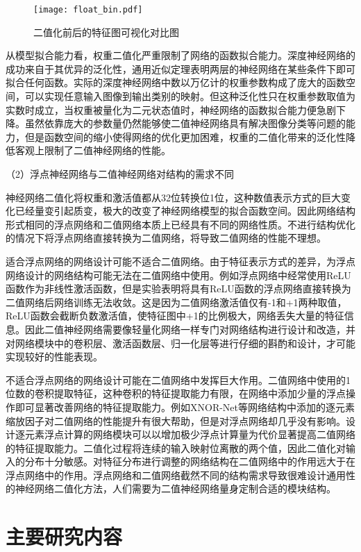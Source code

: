 \begin{figure}[htb]
  \centering
  \texttt{[image: float\_bin.pdf]}
  \caption{二值化前后的特征图可视化对比图}
  \label{fig:float_bin}
\end{figure}

从模型拟合能力看，权重二值化严重限制了网络的函数拟合能力。深度神经网络的成功来自于其优异的泛化性，通用近似定理\citep{ua}表明两层的神经网络在某些条件下即可拟合任何函数。实际的深度神经网络中数以万亿计的权重参数构成了庞大的函数空间，可以实现任意输入图像到输出类别的映射。但这种泛化性只在权重参数取值为实数时成立，当权重被量化为二元状态值时，神经网络的函数拟合能力便急剧下降。虽然依靠庞大的参数量仍然能够使二值神经网络具有解决图像分类等问题的能力，但是函数空间的缩小使得网络的优化更加困难，权重的二值化带来的泛化性降低客观上限制了二值神经网络的性能。

（2）浮点神经网络与二值神经网络对结构的需求不同

神经网络二值化将权重和激活值都从32位转换位1位，这种数值表示方式的巨大变化已经量变引起质变，极大的改变了神经网络模型的拟合函数空间。因此网络结构形式相同的浮点网络和二值网络本质上已经具有不同的网络性质。不进行结构优化的情况下将浮点网络直接转换为二值网络，将导致二值网络的性能不理想。

适合浮点网络的网络设计可能不适合二值网络。由于特征表示方式的差异，为浮点网络设计的网络结构可能无法在二值网络中使用。例如浮点网络中经常使用ReLU函数作为非线性激活函数，但是实验表明将具有ReLU函数的浮点网络直接转换为二值网络后网络训练无法收敛。这是因为二值网络激活值仅有-1和+1两种取值，ReLU函数会截断负数激活值，使特征图中+1的比例极大，网络丢失大量的特征信息。因此二值神经网络需要像轻量化网络一样专门对网络结构进行设计和改造，并对网络模块中的卷积层、激活函数层、归一化层等进行仔细的斟酌和设计，才可能实现较好的性能表现。

不适合浮点网络的网络设计可能在二值网络中发挥巨大作用。二值网络中使用的1位数的卷积提取特征，这种卷积的特征提取能力有限，在网络中添加少量的浮点操作即可显著改善网络的特征提取能力。例如XNOR-Net\cite{xnornet}等网络结构中添加的逐元素缩放因子对二值网络的性能提升有很大帮助，但是对浮点网络却几乎没有影响。设计逐元素浮点计算的网络模块可以以增加极少浮点计算量为代价显著提高二值网络的特征提取能力。二值化过程将连续的输入映射位离散的两个值，因此二值化对输入的分布十分敏感。对特征分布进行调整的网络结构在二值网络中的作用远大于在浮点网络中的作用。浮点网络和二值网络截然不同的结构需求导致很难设计通用性的神经网络二值化方法，人们需要为二值神经网络量身定制合适的模块结构。

\section{主要研究内容}

